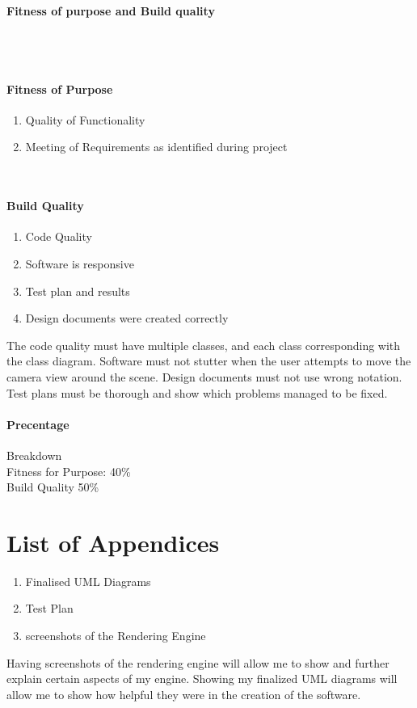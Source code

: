 \paragraph{Fitness of purpose and Build quality} 
\\\\
\paragraph{Fitness of Purpose}
\begin{enumerate}
  \item Quality of Functionality
  \item Meeting of Requirements as identified during project
\end{enumerate}
\\
\paragraph{Build Quality}
\begin{enumerate}
  \item Code Quality
  \item Software is responsive
  \item Test plan and results
  \item Design documents were created correctly
\end{enumerate}
The code quality must have multiple classes, and each class corresponding with the class diagram. 
Software must not stutter when the user attempts to move the camera view around the scene.
Design documents must not use wrong notation.
Test plans must be thorough and show which problems managed to be fixed.
\paragraph{Precentage} Breakdown\\
Fitness for Purpose: 40\% \\ Build Quality 50\%

\section{List of Appendices}
\begin{enumerate}
    \item Finalised UML Diagrams
    \item Test Plan
    \item screenshots of the Rendering Engine
\end{enumerate}
Having screenshots of the rendering engine will allow me to show and further explain certain aspects of my engine.
Showing my finalized UML diagrams will allow me to show how helpful they were in the creation of the software.

